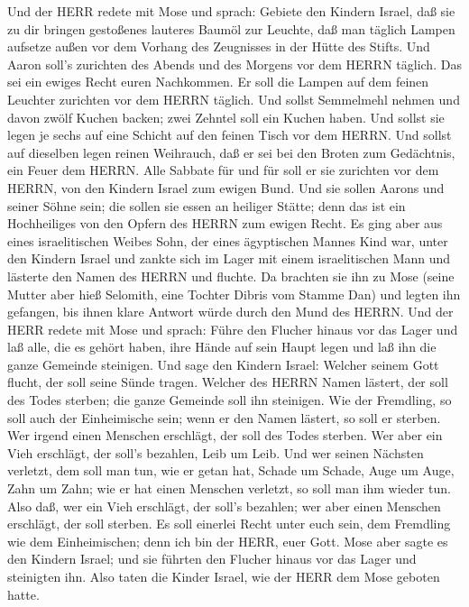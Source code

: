  Und der HERR redete mit Mose und sprach: 
Gebiete den Kindern Israel, daß sie zu dir bringen gestoßenes lauteres
Baumöl zur Leuchte, daß man täglich Lampen aufsetze  außen
vor dem Vorhang des Zeugnisses in der Hütte des Stifts. Und Aaron soll's
zurichten des Abends und des Morgens vor dem HERRN täglich. Das sei ein
ewiges Recht euren Nachkommen.  Er soll die Lampen auf dem
feinen Leuchter zurichten vor dem HERRN täglich.  Und sollst
Semmelmehl nehmen und davon zwölf Kuchen backen; zwei Zehntel soll ein
Kuchen haben.  Und sollst sie legen je sechs auf eine
Schicht auf den feinen Tisch vor dem HERRN.  Und sollst auf
dieselben legen reinen Weihrauch, daß er sei bei den Broten zum
Gedächtnis, ein Feuer dem HERRN.  Alle Sabbate für und für
soll er sie zurichten vor dem HERRN, von den Kindern Israel zum ewigen
Bund.  Und sie sollen Aarons und seiner Söhne sein; die
sollen sie essen an heiliger Stätte; denn das ist ein Hochheiliges von
den Opfern des HERRN zum ewigen Recht.  Es ging aber aus
eines israelitischen Weibes Sohn, der eines ägyptischen Mannes Kind war,
unter den Kindern Israel und zankte sich im Lager mit einem
israelitischen Mann  und lästerte den Namen des HERRN und
fluchte. Da brachten sie ihn zu Mose (seine Mutter aber hieß Selomith,
eine Tochter Dibris vom Stamme Dan)  und legten ihn
gefangen, bis ihnen klare Antwort würde durch den Mund des HERRN.
 Und der HERR redete mit Mose und sprach: 
Führe den Flucher hinaus vor das Lager und laß alle, die es gehört
haben, ihre Hände auf sein Haupt legen und laß ihn die ganze Gemeinde
steinigen.  Und sage den Kindern Israel: Welcher seinem
Gott flucht, der soll seine Sünde tragen.  Welcher des
HERRN Namen lästert, der soll des Todes sterben; die ganze Gemeinde soll
ihn steinigen. Wie der Fremdling, so soll auch der Einheimische sein;
wenn er den Namen lästert, so soll er sterben.  Wer irgend
einen Menschen erschlägt, der soll des Todes sterben.  Wer
aber ein Vieh erschlägt, der soll's bezahlen, Leib um Leib.
 Und wer seinen Nächsten verletzt, dem soll man tun, wie er
getan hat,  Schade um Schade, Auge um Auge, Zahn um Zahn;
wie er hat einen Menschen verletzt, so soll man ihm wieder tun.
 Also daß, wer ein Vieh erschlägt, der soll's bezahlen; wer
aber einen Menschen erschlägt, der soll sterben.  Es soll
einerlei Recht unter euch sein, dem Fremdling wie dem Einheimischen;
denn ich bin der HERR, euer Gott.  Mose aber sagte es den
Kindern Israel; und sie führten den Flucher hinaus vor das Lager und
steinigten ihn. Also taten die Kinder Israel, wie der HERR dem Mose
geboten hatte.

